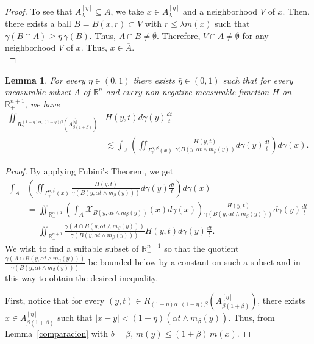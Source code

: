 \documentclass[leqno,11pt]{amsart}
\theoremstyle{plain}
\newtheorem{lemma}{Lemma}
\theoremstyle{remark}
\begin{document}
{{{\begin{proof}
To see that $A_\lambda^{[\eta]}\subseteq \overline{A}$, we take $x\in A_\lambda^{[\eta]}$ and a neighborhood $V$ of $x$. Then, there exists a ball $B=B(x,r)\subset V$ with $r\leq \lambda m(x)$ such that $\gamma(B\cap A)\geq \eta\, \gamma(B)$. Thus, $A\cap B\neq \emptyset$. Therefore, $V\cap A\neq \emptyset$ for any neighborhood $V$ of $x$. Thus, $x\in \overline{A}$.\\
\end{proof}

 




\begin{lemma}\label{lema: desigualdad integral, relacion entre eta y beta}
For every $\eta\in (0,1)$ there exists $\bar{\eta}\in (0,1)$ such that for every measurable subset $A$ of $\mathbb R^n$ and every non-negative measurable function $H$ on $\mathbb R^{n+1}_+$, we have
\begin{align*}
    \iint_{R^{(1-\eta)\alpha, (1-\eta)\beta}_\gamma\left(A_{\beta(1+\beta)}^{[\bar{\eta]}}\right)} & H(y,t) d\gamma(y) \frac{dt}{t} \\
    &\lesssim \int_A \left(\iint_{\Gamma_\gamma^{\alpha, \beta}(x)} \frac{H(y,t)}{\gamma(B(y,\alpha t\wedge m_\beta(y))} d\gamma(y) \frac{dt}{t}\right) d\gamma(x).
\end{align*}
\end{lemma}

\begin{proof}
By applying Fubini's Theorem, we get
\begin{align*}
    \int_A &\left(\iint_{\Gamma_\gamma^{\alpha, \beta}(x)} \frac{H(y,t)}{\gamma(B(y,\alpha t\wedge m_\beta(y)))} d\gamma(y) \frac{dt}{t}\right) d\gamma(x) \\
    &= \iint_{\mathbb R^{n+1}_+} \left(\int_A \mathcal{X}_{B(y,\alpha t\wedge m_\beta (y))}(x) d\gamma(x)\right)  \frac{H(y,t)}{\gamma(B(y,\alpha t\wedge m_\beta(y)))} d\gamma(y) \frac{dt}{t}\\
    &= \iint_{\mathbb R^{n+1}_+} \frac{\gamma(A\cap B(y,\alpha t\wedge m_\beta (y)))}{\gamma(B(y,\alpha t\wedge m_\beta (y)))} H(y,t) d\gamma(y) \frac{dt}{t}.
\end{align*}
We wish to find a suitable subset of ${\mathbb R}^{n+1}_+$ so that the quotient $\frac{\gamma(A\cap B(y,\alpha t\wedge m_\beta(y)))}{\gamma(B(y,\alpha t\wedge m_\beta(y)))}$ be bounded below by a constant on such a subset and  in this way to obtain the desired inequality.

First, notice that for every $(y,t)\in R_{(1-\eta)\alpha, (1-\eta)\beta}\left(A^{[\bar{\eta}]}_{\beta (1+\beta)}\right)$, there exists $x\in A^{[\bar{\eta}]}_{\beta(1+\beta)}$ such that ${|x-y|<(1-\eta)(\alpha t\wedge m_\beta(y))}$. Thus, from Lemma~\ref{comparacion} with $b=\beta$, $ m(y)\leq (1+\beta)\, m(x)$. 


\end{proof}}}}
\end{document}
